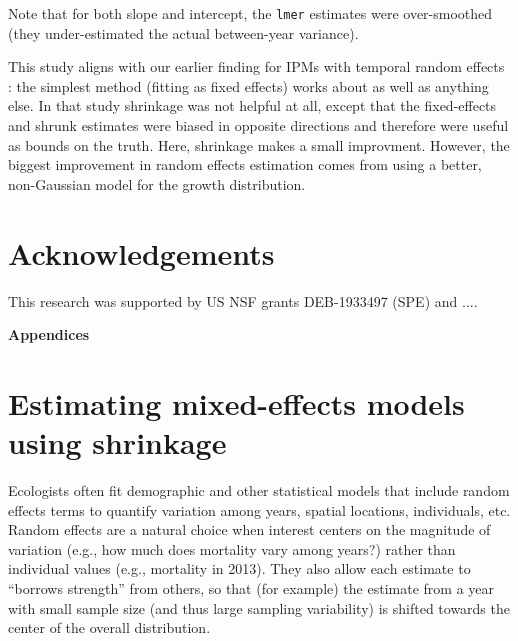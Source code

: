 \documentclass[11pt]{article}
\begin{document}
{\begin{enumerate}
Note that for both slope and intercept, the \texttt{lmer} estimates were over-smoothed (they under-estimated the
actual between-year variance). 

This study aligns with our earlier finding for IPMs with temporal random effects \citep{metcalf-etal-2015}: the simplest method (fitting as
fixed effects) works about as well as anything else. In that study shrinkage was not helpful at all, except that the fixed-effects 
and shrunk estimates were biased in opposite directions and therefore were useful as bounds on the truth. Here, shrinkage 
makes a small improvment. However, the biggest improvement in random effects estimation 
comes from using a better, non-Gaussian model for the growth distribution.  

\end{enumerate} 


\clearpage 

\section*{Acknowledgements} 
This research was supported by US NSF grants DEB-1933497 (SPE) and .... 

\newpage 

%



\newpage 
\clearpage 
\setcounter{equation}{0}
\setcounter{figure}{0}
\setcounter{section}{0}
\setcounter{table}{0}
\setcounter{Box}{0}
\renewcommand{\theequation}{S.\arabic{equation}}
\renewcommand{\thetable}{S-\arabic{table}}
\renewcommand{\thefigure}{S-\arabic{figure}}
\renewcommand{\theBox}{S-\arabic{Box}}
\renewcommand{\thesection}{S.\arabic{section}}

\centerline{\Large{\textbf{Appendices}}}

\section{Estimating mixed-effects models using shrinkage}

Ecologists often fit demographic and other statistical models that include random effects terms to
quantify variation among years, spatial locations, individuals, etc. Random effects
are a natural choice when interest centers on the magnitude of variation (e.g., how much does mortality vary among years?)  
rather than individual values (e.g., mortality in 2013). They also allow each estimate to 
``borrows strength'' from others, so that (for example) the estimate from a year with small sample size (and thus large 
sampling variability) is shifted towards the center of the overall distribution. 

}
\end{document}
